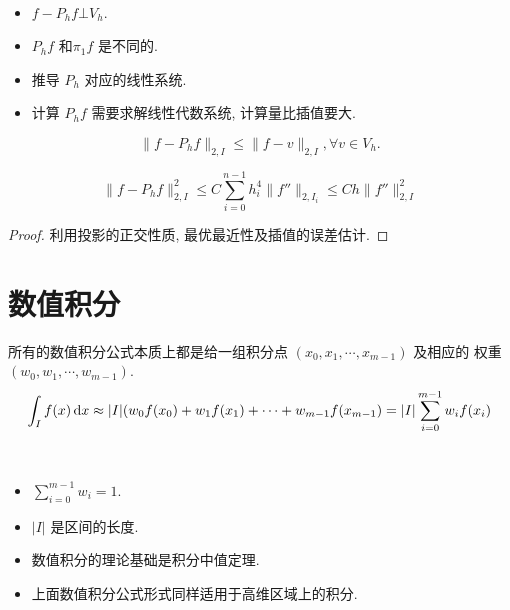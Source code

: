 \documentclass{article}
\begin{document}
\begin{framed}
\begin{remark}
 ~   
\begin{itemize}
    \item $f - P_h f \bot V_h$.
    \item $P_h f$ 和$\pi_1 f$ 是不同的.
    \item 推导 $P_h$ 对应的线性系统.
    \item 计算 $P_h f$ 需要求解线性代数系统, 计算量比插值要大.
\end{itemize}
\end{remark}
\end{framed}

\begin{framed}
    \begin{theorem}
        $$
        \|f-P_hf\|_{2, I} \leq \|f - v\|_{2, I}, \forall v \in V_h.
        $$
    \end{theorem}
    \begin{theorem}
        $$
        \|f- P_h f\|_{2,I}^2 \leq C \sum_{i=0}^{n-1} h_i^4 \|f''\|_{2, I_i}
        \leq C h \|f''\|_{2, I}^2
        $$
    \end{theorem}
    \begin{proof}
        利用投影的正交性质, 最优最近性及插值的误差估计.
    \end{proof}
\end{framed}

\section{数值积分}

所有的数值积分公式本质上都是给一组积分点 $(x_0, x_1, \cdots, x_{m-1})$ 及相应的
权重 $(w_0, w_1, \cdots, w_{m-1})$. 
$$
\int_I f(x) \,\mathrm d x \approx |I|(w_0 f(x_0) + w_1 f(x_1) + \cdots + w_{m-1}
f(x_{m-1}) = |I|\sum_{i=0}^{m-1} w_if(x_i)
$$

\begin{framed}
    \begin{remark}
        ~
        \begin{itemize}
            \item $\sum_{i=0}^{m-1}w_i = 1$.
            \item $|I|$ 是区间的长度.
            \item 数值积分的理论基础是积分中值定理.
            \item 上面数值积分公式形式同样适用于高维区域上的积分.
        \end{itemize}
    \end{remark}
\end{framed}
\end{document}
